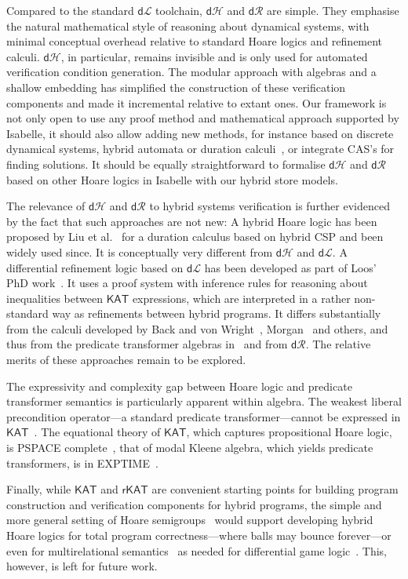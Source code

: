 \documentclass[envcountsame,envcountsect]{llncs}
\newcommand{\KAT}{\mathsf{KAT}}
\newcommand{\rKAT}{\mathsf{rKAT}}
\newcommand{\dL}{\mathsf{d}\mathcal{L}}
\newcommand{\dH}{\mathsf{d}\mathcal{H}}
\newcommand{\dR}{\mathsf{d}\mathcal{R}}
\begin{document}
Compared to the standard $\dL$ toolchain, $\dH$ and $\dR$ are
simple. They emphasise the natural mathematical style of reasoning
about dynamical systems, with minimal conceptual overhead relative to
standard Hoare logics and refinement calculi. $\dH$, in particular,
remains invisible and is only used for automated verification
condition generation. The modular approach with algebras and a shallow
embedding has simplified the construction of these verification
components and made it incremental relative to extant ones. Our
framework is not only open to use any proof method and mathematical
approach supported by Isabelle, it should also allow adding new
methods, for instance based on discrete dynamical systems, hybrid
automata or duration calculi~\cite{LiuLQZZZZ10}, or integrate CAS's
for finding solutions. It should be equally straightforward to
formalise $\dH$ and $\dR$ based on other Hoare logics in Isabelle with
our hybrid store models.

The relevance of $\dH$ and $\dR$ to hybrid systems verification is
further evidenced by the fact that such approaches are not new: A
hybrid Hoare logic has been proposed by Liu et al.~\cite{LiuLQZZZZ10}
for a duration calculus based on hybrid CSP and been widely used
since. It is conceptually very different from $\dH$ and $\dL$. A
differential refinement logic based on $\dL$ has been developed as
part of Loos' PhD work~\cite{LoosP16}.  It uses a proof system with
inference rules for reasoning about inequalities between $\KAT$
expressions, which are interpreted in a rather non-standard way as
refinements between hybrid programs. It differs substantially from the
calculi developed by Back and von Wright~\cite{BackW98},
Morgan~\cite{Morgan94} and others, and thus from the predicate
transformer algebras in~\cite{MuniveS19} and from $\dR$.  The relative
merits of these approaches remain to be explored.

The expressivity and complexity gap between Hoare logic and predicate
transformer semantics is particularly apparent within algebra. The
weakest liberal precondition operator---a standard predicate
transformer---cannot be expressed in $\KAT$~\cite{Struth18}.  The
equational theory of $\KAT$, which captures propositional Hoare logic,
is PSPACE complete~\cite{KozenCS96}, that of modal Kleene algebra,
which yields predicate transformers, is in EXPTIME~\cite{MollerS06}.

Finally, while $\KAT$ and $\rKAT$ are convenient starting points for
building program construction and verification components for hybrid
programs, the simple and more general setting of Hoare
semigroups~\cite{Struth18} would support developing hybrid Hoare
logics for total program correctness---where balls may bounce
forever---or even for multirelational
semantics~\cite{FurusawaS16,FurusawaS15} as needed for differential
game logic~\cite{Platzer18}. This, however, is left for future work.










\end{document}
